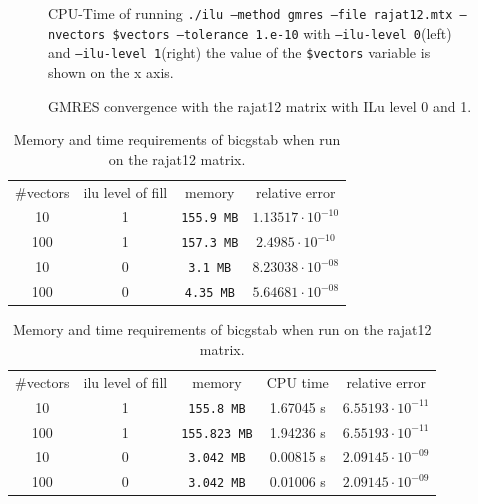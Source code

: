 \begin{figure}
\centering

\caption{CPU-Time of running \texttt{./ilu --method gmres --file rajat12.mtx  --nvectors \$vectors --tolerance 1.e-10} with \texttt{--ilu-level 0}(left) and \texttt{--ilu-level 1}(right) the value of the \texttt{\$vectors} variable is shown on the x axis.}
\label{fig:iluRajatCompTime}
\end{figure} 
\begin{figure}
\centering

\caption{GMRES convergence with the rajat12 matrix with ILu level 0 and 1.}
\label{fig:rajatConvergence}
\end{figure}
\begin{table}
\centering
\begin{tabular}{|c|c|c|c|} \hline
  \#vectors & ilu level of fill & memory & relative error \\
   10 & 1 & \texttt{155.9 MB} & $1.13517 \cdot 10^{-10}$ \\
   100 & 1 & \texttt{157.3 MB}& $2.4985  \cdot 10^{-10}$ \\
   10 &  0 & \texttt{3.1 MB}  & $8.23038 \cdot 10^{-08}$ \\
   100 & 0 & \texttt{4.35 MB} & $5.64681 \cdot 10^{-08}$ \\ \hline
\end{tabular}
\caption{Memory requirements of GMRES when run on the rajat12 matrix. }
\label{tab:RajatMemoryGMRES}
\begin{tabular}{|c|c|c|c|c|} \hline
  \#vectors & ilu level of fill  & memory & CPU time & relative error \\
   10  & 1  & \texttt{155.8 MB}    & 1.67045 s & $6.55193 \cdot 10^{-11}$ \\
   100 & 1  & \texttt{155.823 MB} & 1.94236 s & $6.55193 \cdot 10^{-11}$  \\
   10  & 0  & \texttt{3.042 MB}   & 0.00815 s & $2.09145 \cdot 10^{-09}$  \\
   100 & 0  & \texttt{3.042 MB}   & 0.01006 s & $2.09145 \cdot 10^{-09}$  \\ \hline
\end{tabular}
\caption{Memory and time requirements of bicgstab when run on the rajat12 matrix. }
\label{tab:RajatMemoryBicgstab}
\end{table}
